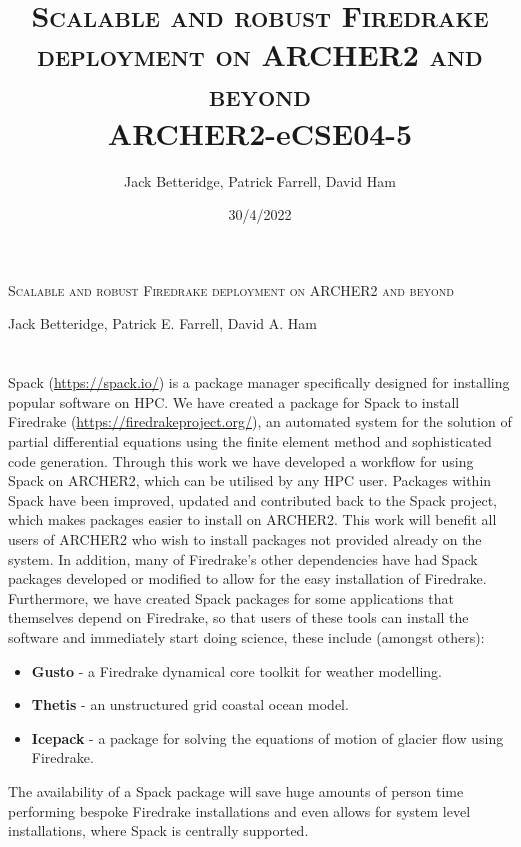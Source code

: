 \documentclass[a4paper,11pt]{article}
\title{\textsc{Scalable and robust Firedrake deployment on ARCHER2 and beyond}\\
\Large ARCHER2-eCSE04-5}
\author{Jack Betteridge, Patrick Farrell, David Ham}
\date{30/4/2022}
\begin{document}


\begin{center}\huge\textsc{Scalable and robust Firedrake deployment on ARCHER2 and beyond}\end{center}
\begin{center}\large{Jack Betteridge, Patrick E. Farrell, David A. Ham}\end{center}
\section*{}
\label{sec:intro}
Spack (\url{https://spack.io/}) is a package manager specifically designed for installing popular software on HPC.
We have created a package for Spack to install Firedrake (\url{https://firedrakeproject.org/}), an automated system for the solution of partial differential equations using the finite element method and sophisticated code generation.
Through this work we have developed a workflow for using Spack on ARCHER2, which can be utilised by any HPC user.
Packages within Spack have been improved, updated and contributed back to the Spack project, which makes packages easier to install on ARCHER2.
This work will benefit all users of ARCHER2 who wish to install packages not provided already on the system.
In addition, many of Firedrake's other dependencies have had Spack packages developed or modified to allow for the easy installation of Firedrake.
Furthermore, we have created Spack packages for some applications that themselves depend on Firedrake, so that users of these tools can install the software and immediately start doing science, these include (amongst others):
\begin{itemize}[topsep=2pt, partopsep=0pt, itemsep=1pt, parsep=1pt]
	\item \textbf{Gusto} - a Firedrake dynamical core toolkit for weather modelling.
	\item \textbf{Thetis} - an unstructured grid coastal ocean model.
	\item \textbf{Icepack} - a package for solving the equations of motion of glacier flow using Firedrake.
\end{itemize}
The availability of a Spack package will save huge amounts of person time performing bespoke Firedrake installations and even allows for system level installations, where Spack is centrally supported.
\end{document}
